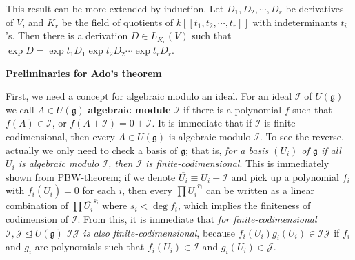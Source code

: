 \documentclass{article}
\newcommand{\lie}[1]{\mathfrak{#1}}
\begin{document}
This result can be more extended by induction.
Let $D_1, D_2, \cdots, D_r$ be derivatives of $V$, and $K_r$ be the field of quotients of $k[[t_1, t_2, \cdots, t_r]]$ with indeterminants $t_i$'s.
Then there is a derivation $D \in L_{K_r}(V)$ such that $\exp{D} = \exp{t_1 D_1} \exp{t_2 D_2} \cdots \exp{t_r D_r}$.

\newpage

\textbf{Preliminaries for Ado's theorem}

First, we need a concept for algebraic modulo an ideal.
For an ideal $\mathcal{I}$ of $U(\lie{g})$ we call $A \in U(\lie{g})$ \textbf{algebraic module $\mathcal{I}$} if there is a polynomial $f$ such that $f(A) \in \mathcal{I}$, or $f(A + \mathcal{I}) = 0 + \mathcal{I}$.
It is immediate that if $\mathcal{I}$ is finite-codimensional, then every $A \in U(\lie{g})$ is algebraic modulo $\mathcal{I}$.
To see the reverse, actually we only need to check a basis of $\lie{g}$; that is, \textit{for a basis $(U_i)$ of $\lie{g}$ if all $U_i$ is algebraic modulo $\mathcal{I}$, then $\mathcal{I}$ is finite-codimensional}.
This is immediately shown from PBW-theorem; if we denote $\overline{U_i} \equiv U_i + \mathcal{I}$ and pick up a polynomial $f_i$ with $f_i(\overline{U_i}) = 0$ for each $i$, then every $\prod \overline{U_i}^{r_i}$ can be written as a linear combination of $\prod \overline{U_i}^{s_i}$ where $s_i < \deg{f_i}$, which implies the finiteness of codimension of $\mathcal{I}$.
From this, it is immediate that \textit{for finite-codimensional $\mathcal{I}, \mathcal{J} \trianglelefteq U(\lie{g})$ $\mathcal{I} \mathcal{J}$ is also finite-codimensional}, because $f_i(U_i) g_i(U_i) \in \mathcal{I} \mathcal{J}$ if $f_i$ and $g_i$ are polynomials such that $f_i(U_i) \in \mathcal{I}$ and $g_i(U_i) \in \mathcal{J}$.
\end{document}

